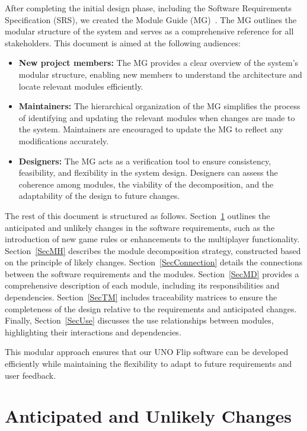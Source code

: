 \documentclass[12pt, titlepage]{article}
\begin{document}
After completing the initial design phase, including the Software Requirements Specification (SRS), we created the Module Guide (MG)~\citep{ParnasEtAl1984}. The MG outlines the modular structure of the system and serves as a comprehensive reference for all stakeholders. This document is aimed at the following audiences:

\begin{itemize}
\item \textbf{New project members:} The MG provides a clear overview of the system's modular structure, enabling new members to understand the architecture and locate relevant modules efficiently.
\item \textbf{Maintainers:} The hierarchical organization of the MG simplifies the process of identifying and updating the relevant modules when changes are made to the system. Maintainers are encouraged to update the MG to reflect any modifications accurately.
\item \textbf{Designers:} The MG acts as a verification tool to ensure consistency, feasibility, and flexibility in the system design. Designers can assess the coherence among modules, the viability of the decomposition, and the adaptability of the design to future changes.
\end{itemize}

The rest of this document is structured as follows. Section~\ref{SecChange} outlines the anticipated and unlikely changes in the software requirements, such as the introduction of new game rules or enhancements to the multiplayer functionality. Section~\ref{SecMH} describes the module decomposition strategy, constructed based on the principle of likely changes. Section~\ref{SecConnection} details the connections between the software requirements and the modules. Section~\ref{SecMD} provides a comprehensive description of each module, including its responsibilities and dependencies. Section~\ref{SecTM} includes traceability matrices to ensure the completeness of the design relative to the requirements and anticipated changes. Finally, Section~\ref{SecUse} discusses the use relationships between modules, highlighting their interactions and dependencies.

This modular approach ensures that our UNO Flip software can be developed efficiently while maintaining the flexibility to adapt to future requirements and user feedback.


\section{Anticipated and Unlikely Changes} \label{SecChange}
\end{document}
